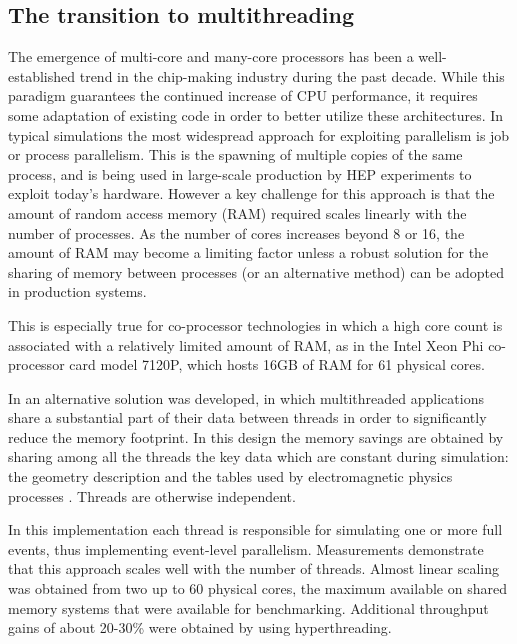 \label{sec:multithreading}

\subsection{\textbf{The transition to multithreading}}
The emergence of multi-core and many-core processors has been a well-established
trend in the chip-making industry during the past decade.  While this paradigm 
guarantees the continued increase of CPU performance, it requires some 
adaptation of existing code in order to better utilize these architectures.  In
typical \Gfour{} simulations the most widespread approach for exploiting 
parallelism is job or process parallelism.  This is the spawning of multiple 
copies of the same process, and is being used in large-scale production by HEP 
experiments to exploit today's hardware.  However a key challenge for this 
approach is that the amount of random access memory (RAM) required scales 
linearly with the number of processes.  As the number of cores increases beyond
8 or 16, the amount of RAM may become a limiting factor unless a robust solution
for the sharing of memory between processes (or an alternative method) can be 
adopted in production systems.

This is especially true for co-processor technologies in which a high core count
is associated with a relatively limited amount of RAM, as in the Intel Xeon Phi 
co-processor card model 7120P, which hosts 16GB of RAM for 61 physical cores.

In \Gfour{} an alternative solution was developed, in which multithreaded 
applications share a substantial part of their data between threads in order to
significantly reduce the memory footprint.  In this design the memory savings 
are obtained by sharing among all the threads the key data which are constant 
during simulation: the geometry description and the tables used by 
electromagnetic physics processes \cite{MT:xdong}.  Threads are otherwise 
independent.

In this implementation each thread is responsible for simulating one or more
full events, thus implementing event-level parallelism.  Measurements 
demonstrate that this approach scales well with the number of threads.  Almost
linear scaling was obtained from two up to 60 physical cores, the maximum available
on shared memory systems that were available for benchmarking.  Additional 
throughput gains of about 20-30\% were obtained by using hyperthreading.

